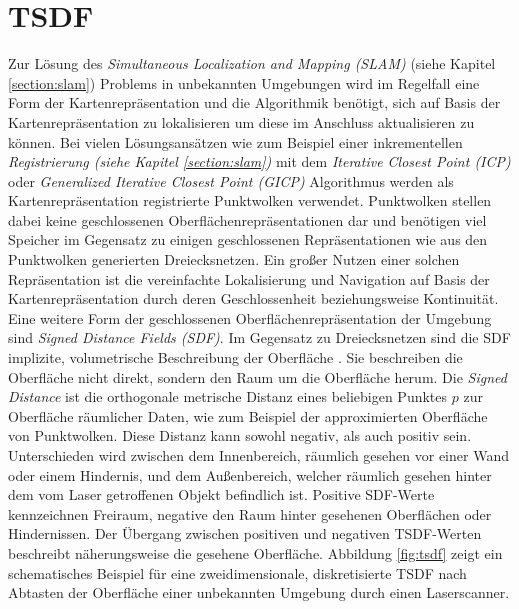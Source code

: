 \section{TSDF}
\label{section:tsdf}

Zur Lösung des \emph{Simultaneous Localization and Mapping (SLAM)} (siehe Kapitel \ref{section:slam}) Problems in unbekannten Umgebungen wird im Regelfall eine Form der Kartenrepräsentation und die Algorithmik benötigt, sich auf Basis der Kartenrepräsentation zu lokalisieren um diese im Anschluss aktualisieren zu können. Bei vielen Lösungsansätzen wie zum Beispiel einer inkrementellen \emph{Registrierung (siehe Kapitel \ref{section:slam})} mit dem \emph{Iterative Closest Point (ICP)} \cite{Besl:1992} oder \emph{Generalized Iterative Closest Point (GICP)} \cite{segal2009generalized} Algorithmus werden als Kartenrepräsentation registrierte Punktwolken verwendet. Punktwolken stellen dabei keine geschlossenen Oberflächenrepräsentationen dar und benötigen viel Speicher im Gegensatz zu einigen geschlossenen Repräsentationen wie aus den Punktwolken generierten Dreiecksnetzen. Ein großer Nutzen einer solchen Repräsentation ist die vereinfachte Lokalisierung und Navigation auf Basis der Kartenrepräsentation durch deren Geschlossenheit beziehungsweise Kontinuität. Eine weitere Form der geschlossenen Oberflächenrepräsentation der Umgebung sind \emph{Signed Distance Fields (SDF)}. Im Gegensatz zu Dreiecksnetzen sind die SDF implizite, volumetrische Beschreibung der Oberfläche \cite{werner2014truncated}. Sie beschreiben die Oberfläche nicht direkt, sondern den Raum um die Oberfläche herum. Die \emph{Signed Distance} ist die orthogonale metrische Distanz eines beliebigen Punktes $p$ zur Oberfläche räumlicher Daten, wie zum Beispiel der approximierten Oberfläche von Punktwolken. Diese Distanz kann sowohl negativ, als auch positiv sein. Unterschieden wird zwischen dem Innenbereich, räumlich gesehen vor einer Wand oder einem Hindernis, und dem Außenbereich, welcher räumlich gesehen hinter dem vom Laser getroffenen Objekt befindlich ist. Positive SDF-Werte kennzeichnen Freiraum, negative den Raum hinter gesehenen Oberflächen oder Hindernissen. Der Übergang zwischen positiven und negativen TSDF-Werten beschreibt näherungsweise die gesehene Oberfläche.
Abbildung \ref{fig:tsdf} zeigt ein schematisches Beispiel für eine zweidimensionale, diskretisierte TSDF nach Abtasten der Oberfläche einer unbekannten Umgebung durch einen Laserscanner.

